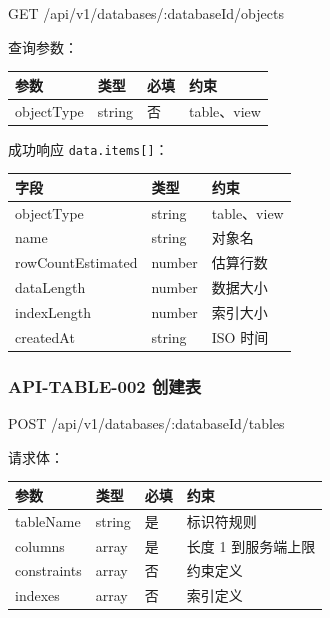 \documentclass[
  a4paper,
  UTF8]{ctexart}
\newenvironment{Shaded}{}{}
\newcommand{\NormalTok}[1]{#1}
\begin{document}
\begin{Shaded}
\begin{Highlighting}[]
\NormalTok{GET /api/v1/databases/:databaseId/objects}
\end{Highlighting}
\end{Shaded}

查询参数：

\begin{longtable}[]{@{}llll@{}}
\toprule
参数 & 类型 & 必填 & 约束 \\
\midrule
\endhead
objectType & string & 否 & table、view \\
\bottomrule
\end{longtable}

成功响应 \texttt{data.items{[}{]}}：

\begin{longtable}[]{@{}lll@{}}
\toprule
字段 & 类型 & 约束 \\
\midrule
\endhead
objectType & string & table、view \\
name & string & 对象名 \\
rowCountEstimated & number & 估算行数 \\
dataLength & number & 数据大小 \\
indexLength & number & 索引大小 \\
createdAt & string & ISO 时间 \\
\bottomrule
\end{longtable}

\hypertarget{api-table-002-ux521bux5efaux8868}{%
\subsubsection{API-TABLE-002
创建表}\label{api-table-002-ux521bux5efaux8868}}

\begin{Shaded}
\begin{Highlighting}[]
\NormalTok{POST /api/v1/databases/:databaseId/tables}
\end{Highlighting}
\end{Shaded}

请求体：

\begin{longtable}[]{@{}llll@{}}
\toprule
参数 & 类型 & 必填 & 约束 \\
\midrule
\endhead
tableName & string & 是 & 标识符规则 \\
columns & array & 是 & 长度 1 到服务端上限 \\
constraints & array & 否 & 约束定义 \\
indexes & array & 否 & 索引定义 \\
\bottomrule
\end{longtable}
\end{document}
